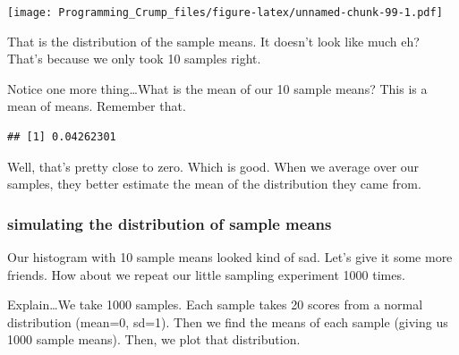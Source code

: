 \documentclass[]{book}
\newenvironment{Shaded}{\begin{snugshade}}{\end{snugshade}}
\newcommand{\KeywordTok}[1]{\textcolor[rgb]{0.13,0.29,0.53}{\textbf{{#1}}}}
\newcommand{\NormalTok}[1]{{#1}}
\theoremstyle{definition}
\theoremstyle{definition}
\theoremstyle{definition}
\theoremstyle{remark}
\begin{document}
\texttt{[image: Programming\_Crump\_files/figure-latex/unnamed-chunk-99-1.pdf]}

That is the distribution of the sample means. It doesn't look like much
eh? That's because we only took 10 samples right.

Notice one more thing\ldots{}What is the mean of our 10 sample means?
This is a mean of means. Remember that.

\begin{Shaded}
\end{Shaded}

\begin{verbatim}
## [1] 0.04262301
\end{verbatim}

Well, that's pretty close to zero. Which is good. When we average over
our samples, they better estimate the mean of the distribution they came
from.

\subsubsection{simulating the distribution of sample
means}\label{simulating-the-distribution-of-sample-means}

Our histogram with 10 sample means looked kind of sad. Let's give it
some more friends. How about we repeat our little sampling experiment
1000 times.

Explain\ldots{}We take 1000 samples. Each sample takes 20 scores from a
normal distribution (mean=0, sd=1). Then we find the means of each
sample (giving us 1000 sample means). Then, we plot that distribution.
\end{document}
